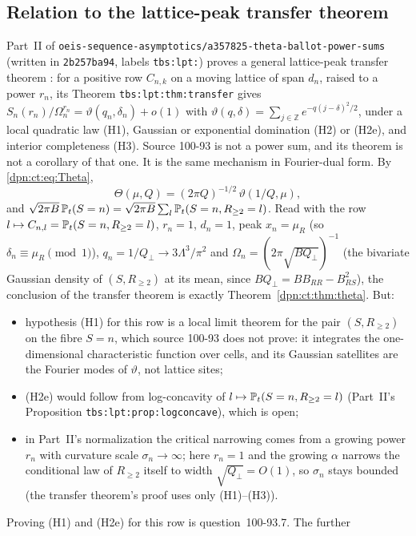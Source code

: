 \documentclass[11pt]{article}
\numberwithin{equation}{section}
\theoremstyle{definition}\newtheorem{definition}[theorem]{Definition}
\theoremstyle{remark}\newtheorem{remark}[theorem]{Remark}
\newcommand{\file}[1]{\nolinkurl{#1}}
\begin{document}
\subsection{Relation to the lattice-peak transfer theorem}\label{dpn:ct:sec:transfer}
Part~II of \file{oeis-sequence-asymptotics/a357825-theta-ballot-power-sums}
(written in \texttt{2b257ba94}, labels \texttt{tbs:lpt:}) proves a general
lattice-peak transfer theorem \cite{tbs}: for a positive row $C_{n,k}$ on a
moving lattice of span $d_n$, raised to a power $r_n$, its Theorem
\texttt{tbs:lpt:thm:transfer} gives $S_n(r_n)/\Omega_n^{r_n}=\vartheta(q_n,\delta_n)+o(1)$
with $\vartheta(q,\delta)=\sum_{j\in\mathbb Z}e^{-q(j-\delta)^2/2}$, under a local
quadratic law (H1), Gaussian or exponential domination (H2) or (H2e), and
interior completeness (H3).  Source 100-93 is not a power sum, and its theorem
is not a corollary of that one.  It is the same mechanism in Fourier-dual
form.  By \eqref{dpn:ct:eq:Theta},
\[
 \Theta(\mu,Q)=(2\pi Q)^{-1/2}\,\vartheta(1/Q,\mu),
\]
and $\sqrt{2\pi B}\,\mathbb P_t(S=n)=\sqrt{2\pi B}\sum_l\mathbb P_t(S=n,R_{\ge2}=l)$.  Read
with the row $l\mapsto C_{n,l}=\mathbb P_t(S=n,R_{\ge2}=l)$, $r_n=1$, $d_n=1$, peak
$x_n=\mu_R$ (so $\delta_n\equiv\mu_R\pmod1$), $q_n=1/Q_\perp\to3\Lambda^3/\pi^2$
and $\Omega_n=(2\pi\sqrt{BQ_\perp})^{-1}$ (the bivariate Gaussian density of
$(S,R_{\ge2})$ at its mean, since $BQ_\perp=BB_{RR}-B_{RS}^2$), the conclusion of
the transfer theorem is exactly Theorem~\ref{dpn:ct:thm:theta}.  But:
\begin{itemize}
\item hypothesis (H1) for this row is a local limit theorem for the pair
  $(S,R_{\ge2})$ on the fibre $S=n$, which source 100-93 does not prove: it
  integrates the one-dimensional characteristic function over cells, and its
  Gaussian satellites are the Fourier modes of $\vartheta$, not lattice sites;
\item (H2e) would follow from log-concavity of $l\mapsto\mathbb P_t(S=n,R_{\ge2}=l)$
  (Part~II's Proposition \texttt{tbs:lpt:prop:logconcave}), which is open;
\item in Part~II's normalization the critical narrowing comes from a growing
  power $r_n$ with curvature scale $\sigma_n\to\infty$; here $r_n=1$ and the
  growing $\alpha$ narrows the conditional law of $R_{\ge2}$ itself to width
  $\sqrt{Q_\perp}=O(1)$, so $\sigma_n$ stays bounded (the transfer theorem's
  proof uses only (H1)--(H3)).
\end{itemize}
Proving (H1) and (H2e) for this row is question~100-93.7.  The further
\end{document}
